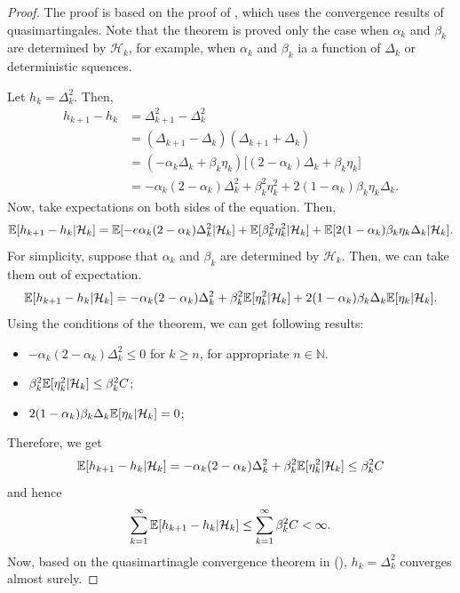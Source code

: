     \begin{proof}
        The proof is based on the proof of \cite{Zhao2025}, which uses the convergence results of quasimartingales.
        Note that the theorem is proved only the case when $\alpha_k$ and $\beta_k$ are determined by $\mathcal{H}_k$, for example,
        when $\alpha_k$ and $\beta_k$ ia a function of $\Delta_k$ or deterministic squences.
        
        Let $h_k = \Delta_k^2$. Then,
        \begin{align}
            h_{k+1} - h_k &= \Delta_{k+1}^2 - \Delta_k^2 \\
                          &= (\Delta_{k+1} - \Delta_k) (\Delta_{k+1} + \Delta_k) \\
                          &= (-\alpha_k\Delta_k + \beta_k\eta_k)\big[ (2-\alpha_k)\Delta_k + \beta_k\eta_k \big] \\
                          &= -\alpha_k(2-\alpha_k)\Delta_k^2 + \beta_k^2\eta_k^2 + 2 (1-\alpha_k)\beta_k\eta_k\Delta_k.
        \end{align}
        Now, take expectations on both sides of the equation. Then,
        \begin{equation}
            \mathbb{E}[h_{k+1} - h_k|\mathcal{H}_k] = \mathbb{E}[-e\alpha_k(2-\alpha_k)\Delta_k^2|\mathcal{H}_k] + \mathbb{E}[\beta_k^2\eta_k^2|\mathcal{H}_k] + \mathbb{E}[2(1-\alpha_k)\beta_k\eta_k\Delta_k|\mathcal{H}_k].
        \end{equation}
        For simplicity, suppose that $\alpha_k$ and $\beta_k$ are determined by $\mathcal{H}_k$. Then, we can take them out of expectation.
        \begin{equation}
            \mathbb{E}[h_{k+1} - h_k|\mathcal{H}_k] = -\alpha_k(2-\alpha_k)\Delta_k^2 + \beta_k^2\mathbb{E}[\eta_k^2|\mathcal{H}_k] + 2(1-\alpha_k)\beta_k\Delta_k\mathbb{E}[\eta_k|\mathcal{H}_k].
        \end{equation}
        Using the conditions of the theorem, we can get following results:
        \begin{itemize}
            \item $-\alpha_k(2-\alpha_k)\Delta_k^2 \leq 0$ for $k \geq n$, for appropriate $n \in \mathbb{N}$.
            \item $\beta_k^2\mathbb{E}[\eta_k^2|\mathcal{H}_k] \leq \beta_k^2C$;
            \item $2(1-\alpha_k)\beta_k\Delta_k\mathbb{E}[\eta_k|\mathcal{H}_k] = 0$;
        \end{itemize}
        Therefore, we get
        \begin{equation}
            \mathbb{E}[h_{k+1}-h_k|\mathcal{H}_k] = -\alpha_k(2-\alpha_k)\Delta_k^2 + \beta_k^2\mathbb{E}[\eta_k^2|\mathcal{H}_k] \leq \beta_k^2C
        \end{equation}
        and hence
        \begin{equation}
            \sum_{k=1}^{\infty}\mathbb{E}[h_{k+1}-h_k|\mathcal{H}_k] \leq \sum_{k=1}^\infty\beta_k^2C < \infty.
        \end{equation}
        Now, based on the quasimartinagle convergence theorem in (), $h_k = \Delta_k^2$ converges almost surely.


\end{proof}
